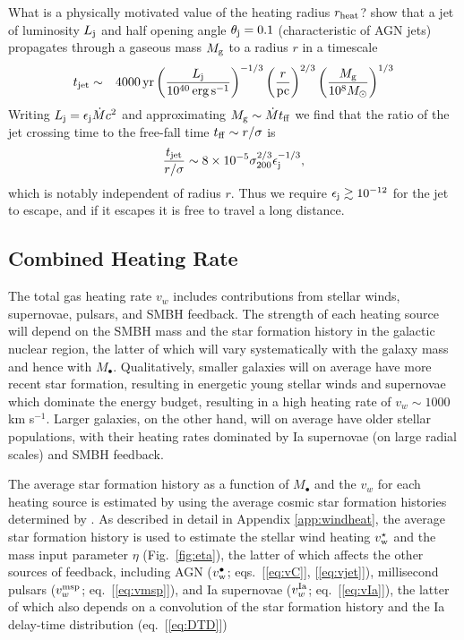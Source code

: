 \documentclass[usenatbib,fleqn]{mn2e}
\newcommand{\Mbh}[1][]{M_{\bullet#1}}
\newcommand{\vwO}{v_{w}}
\begin{document}
What is a physically motivated value of the heating radius $r_{\rm
  heat}$?  \citet{Bromberg+11} show that a jet of luminosity $L_{\rm
  j}$ and half opening angle $\theta_{\rm j} = 0.1$ (characteristic of
AGN jets) propagates through a gaseous mass $M_{\rm g}$ to a radius
$r$ in a timescale
\begin{eqnarray}
t_{\rm jet} &\sim& 4000\,{\rm yr}\left(\frac{{L}_{\rm j}}{10^{40}\,\rm erg\,s^{-1}}\right)^{-1/3}\left(\frac{r}{\rm pc}\right)^{2/3}\left(\frac{M_{\rm g}}{10^{8}M_{\odot}}\right)^{1/3} 
\end{eqnarray}
Writing $L_{\rm j} = \epsilon_{\rm j}\dot{M}c^{2}$ and approximating $M_{\rm g} \sim \dot{M}t_{\rm ff}$ we find that the ratio of the jet crossing time to the free-fall time $t_{\rm ff} \sim r/\sigma$ is 
\begin{equation}
\frac{t_{\rm jet}}{r/\sigma} \sim 8\times 10^{-5}\sigma_{200}^{2/3}\epsilon_{\rm j}^{-1/3},
\end{equation}
which is notably independent of radius $r$.  Thus we require $\epsilon_{\rm j} \gtrsim 10^{-12}$ for the jet to escape, and if it escapes it is free to travel a long distance. 

\subsection{Combined Heating Rate} 

The total gas heating rate $\vwO$ includes contributions from stellar winds, supernovae, pulsars, and SMBH feedback.  The strength of each heating source will depend on the SMBH mass and the star formation history in the galactic nuclear region, the latter of which will vary systematically with the galaxy mass and hence with $\Mbh$.  Qualitatively, smaller galaxies will on average have more recent star formation, resulting in energetic young stellar winds and supernovae which dominate the energy budget, resulting in a high heating rate of $\vwO \sim 1000 $ km s$^{-1}$.  Larger galaxies, on the other hand, will on average have older stellar populations, with their heating rates dominated by Ia supernovae (on large radial scales) and SMBH feedback.

The average star formation history as a function of $\Mbh$ and the $\vwO$ for each heating source is estimated by using the average cosmic star formation histories determined by \citet{MosterNaab+:2013a}.  As described in detail in Appendix \ref{app:windheat}, the average star formation history is used to estimate the stellar wind heating $v_{\rm w}^{\star}$ and the mass input parameter $\eta$ (Fig.~\ref{fig:eta}), the latter of which affects the other sources of feedback, including AGN ($v_{\rm w}^{\bullet}$; eqs.~[\ref{eq:vC}], [\ref{eq:vjet}]), millisecond pulsars ($v_{w}^{\rm msp}$; eq.~[\ref{eq:vmsp}]), and Ia supernovae ($v_{w}^{\rm Ia}$; eq.~[\ref{eq:vIa}]), the latter of which also depends on a convolution of the star formation history and the Ia delay-time distribution (eq.~[\ref{eq:DTD}])
\end{document}
